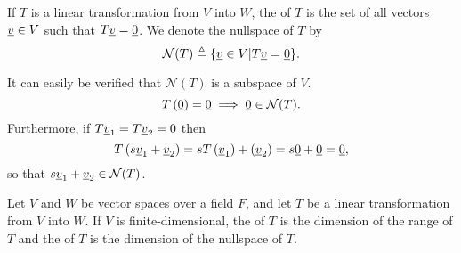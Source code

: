 \begin{definition}
If $T$ is a linear transformation from $V$ into $W$, the  of $T$ is the set of all vectors $\underline{v} \in V$ such that $T \underline{v} = \underline{0}$.
We denote the nullspace of $T$ by
\[ \mathcal{N}(T) \triangleq \{ \underline{v}\in V | T \underline{v} = \underline{0} \} .\]
\end{definition}
It can easily be verified that $\mathcal{N}(T)$ is a subspace of $V$.
\begin{equation*}
T \left( \underline{0} \right) = \underline{0} \implies \underline{0} \in \mathcal{N}(T).
\end{equation*}
Furthermore, if $T \underline{v}_1 = T \underline{v}_2 = 0$ then
\begin{equation*}
T \left( s \underline{v}_1 + \underline{v}_2 \right) = s T \left( \underline{v}_1 \right) + \left( \underline{v}_2 \right) = s \underline{0} + \underline{0} = \underline{0} ,
\end{equation*}
so that $s \underline{v}_1 + \underline{v}_2 \in \mathcal{N}(T)$.

\begin{definition}
Let $V$ and $W$ be vector spaces over a field $F$, and let $T$ be a linear transformation from $V$ into $W$.
If $V$ is finite-dimensional, the  of $T$ is the dimension of the range of $T$ and the  of $T$ is the dimension of the nullspace of $T$.
\end{definition}

